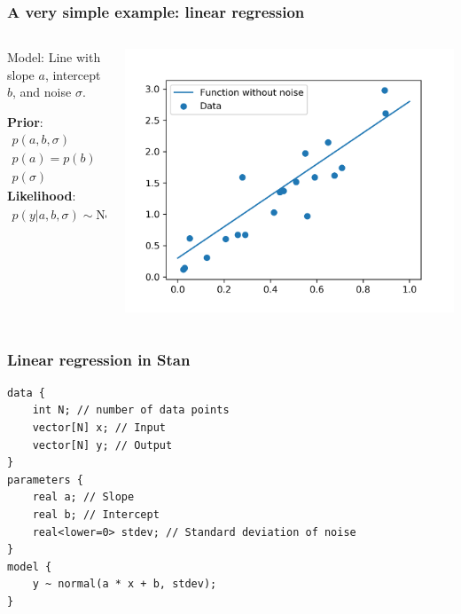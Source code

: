 \documentclass{beamer}
\begin{document}
\begin{frame}
\frametitle{A very simple example: linear regression}
\begin{columns}
\begin{column}{0.5\textwidth}
	Model: Line with slope $a$, intercept $b$, and noise $\sigma$.

	\textbf{Prior}:
	\begin{align*}
		p(a, b, \sigma) & = p(a)p(b)p(\sigma) \\
		p(a) = p(b) & \sim \textrm{Uniform}(-\infty, +\infty) \\
		p(\sigma) & \sim \textrm{Uniform}(0, +\infty)
	\end{align*}
	\textbf{Likelihood}:
	\begin{align*}
		p(y | a, b, \sigma) \sim \textrm{Normal}(ax + b, \sigma^2)	
	\end{align*}
\end{column}
\begin{column}{0.5\textwidth}	
\includegraphics[width=\textwidth]{lin_reg_data}	
\end{column}
\end{columns}
\end{frame}

\begin{frame}[fragile]
\frametitle{Linear regression in Stan}
\begin{verbatim}
data {
    int N; // number of data points
    vector[N] x; // Input
    vector[N] y; // Output
}
parameters {
    real a; // Slope
    real b; // Intercept
    real<lower=0> stdev; // Standard deviation of noise
}
model {
    y ~ normal(a * x + b, stdev);
}
\end{verbatim}
\end{frame}
\end{document}
